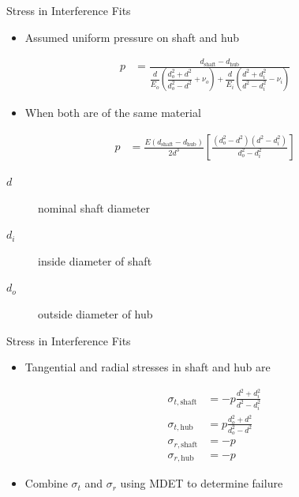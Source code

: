\documentclass[10pt, svgnames]{beamer}
\begin{document}
\begin{frame}[label={sec:orga5c62f3}]{Stress in Interference Fits}
\begin{itemize}
\item Assumed uniform pressure on shaft and hub
\end{itemize}


\begin{align*}
  p &= \frac{d_{\text{shaft}} - d_{\text{hub}}}{\dfrac{d}{E_{o}} \left( \dfrac{d_{o}^{2} + d^{2}}{d_{o}^{2} - d^{2}} + \nu_{o} \right) + \dfrac{d}{E_{i}}\left( \dfrac{d^{2} + d_{i}^{2}}{d^{2} - d_{i}^{2}} - \nu_{i} \right)}
\end{align*}


\begin{itemize}
\item When both are of the same material
\end{itemize}


\begin{align*}
  p &= \frac{E(d_{\text{shaft}} - d_{\text{hub}})}{2d^{3}} \left[ \frac{(d_{o}^{2} - d^{2})(d^{2} - d_{i}^{2})}{d_{o}^{2} - d_{i}^{2}} \right]
\end{align*}

\begin{description}
\item[{\(d\)}] nominal shaft diameter
\item[{\(d_{i}\)}] inside diameter of shaft
\item[{\(d_{o}\)}] outside diameter of hub
\end{description}
\end{frame}

\begin{frame}[label={sec:orga42486d}]{Stress in Interference Fits}
\begin{itemize}
\item Tangential and radial stresses in shaft and hub are

\begin{align*}
  \sigma_{t,\text{shaft}} &= -p \frac{d^{2} + d_{i}^{2}}{d^{2} - d_{i}^{2}} \\
  \sigma_{t,\text{hub}} &= p \frac{d_{o}^{2} + d^{2}}{d_{o}^{2} - d^{2}} \\
  \sigma_{r,\text{shaft}} &= -p \\
  \sigma_{r,\text{hub}} &= -p
\end{align*}

\item Combine \(\sigma_{t}\) and \(\sigma_{r}\) using MDET to determine failure
\end{itemize}
\end{frame}
\end{document}
